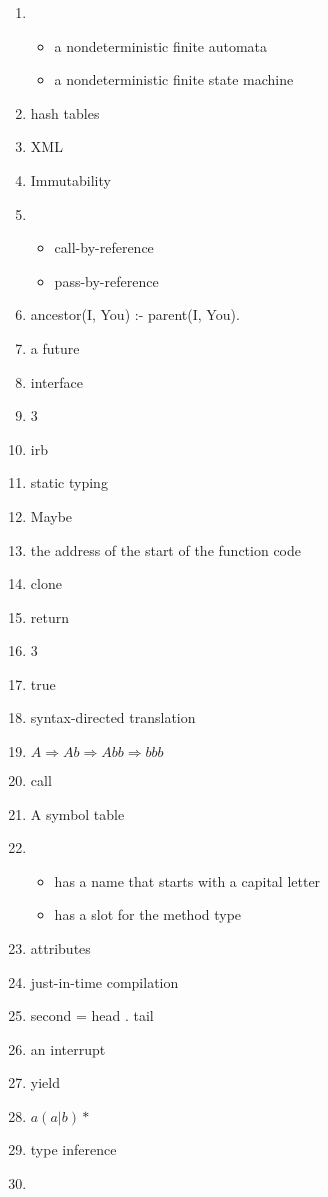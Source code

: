\documentclass{exam}
\begin{document}
\begin{enumerate}
\item \begin{itemize}
\item a nondeterministic finite automata
\item a nondeterministic finite state machine
\end{itemize}
\item hash tables
\item XML
\item Immutability
\item \begin{itemize}
\item call-by-reference
\item pass-by-reference
\end{itemize}
\item ancestor(I, You) :- parent(I, You).
\item a future
\item interface
\item 3
\item irb
\item static typing
\item Maybe
\item the address of the start of the function code
\item clone
\item return
\item 3
\item true
\item syntax-directed translation
\item $A \Rightarrow Ab \Rightarrow Abb \Rightarrow bbb$
\item call
\item A symbol table
\item \begin{itemize}
\item has a name that starts with a capital letter
\item has a slot for the method type
\end{itemize}
\item attributes
\item just-in-time compilation
\item second = head . tail
\item an interrupt
\item yield
\item $a (a|b)*$
\item type inference
\item \begin{itemize}

\end{itemize}
\end{enumerate}
\end{document}
